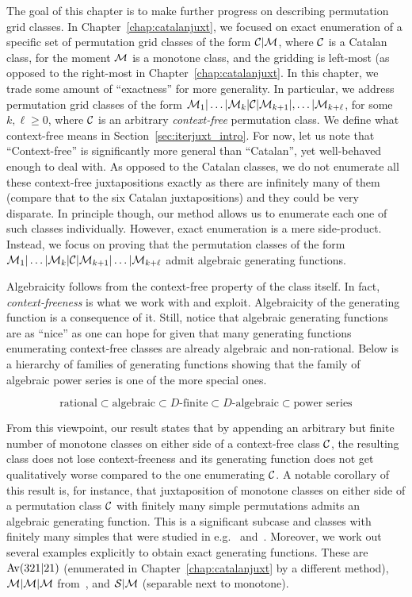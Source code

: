 \documentclass[12pt, a4paper, twoside]{report}
\begin{document}
The goal of this chapter is to make further progress on describing permutation grid classes. In Chapter~\ref{chap:catalanjuxt}, we focused on exact enumeration of a specific set of permutation grid classes of the form $\mathcal{C}|\mathcal{M}$, where $\mathcal{C}$ is a Catalan class, for the moment $\mathcal{M}$ is a monotone class, and the gridding is left-most (as opposed to the right-most in Chapter~\ref{chap:catalanjuxt}. In this chapter, we trade some amount of ``exactness'' for more generality. In particular, we address permutation grid classes of the form $\mathcal{M}_1|\ldots|\mathcal{M}_k|\mathcal{C}|\mathcal{M}_{k+1}|,\ldots|\mathcal{M}_{k+\ell}$, for some $k,\ell \geq 0$, where $\mathcal{C}$ is an arbitrary \emph{context-free} permutation class. We define what context-free means in Section~\ref{sec:iterjuxt_intro}. For now, let us note that ``Context-free'' is significantly more general than ``Catalan'', yet well-behaved enough to deal with. As opposed to the Catalan classes, we do not enumerate all these context-free juxtapositions exactly as there are infinitely many of them (compare that to the six Catalan juxtapositions) and they could be very disparate. In principle though, our method allows us to enumerate each one of such classes individually. However, exact enumeration is a mere side-product. Instead, we focus on proving that the permutation classes of the form $\mathcal{M}_1|\ldots|\mathcal{M}_k|\mathcal{C}|\mathcal{M}_{k+1}|\ldots|\mathcal{M}_{k+\ell}$ admit algebraic generating functions.

Algebraicity follows from the context-free property of the class itself. In fact, \emph{context-freeness} is what we work with and exploit. Algebraicity of the generating function is a consequence of it. Still, notice that algebraic generating functions are as ``nice'' as one can hope for given that many generating functions enumerating context-free classes are already algebraic and non-rational. Below is a hierarchy of families of generating functions showing that the family of algebraic power series is one of the more special ones.

$$\text{rational} \subset \text{algebraic} \subset \text{$D$-finite} \subset \text{$D$-algebraic} \subset \text{power series}$$

From this viewpoint, our result states that by appending an arbitrary but finite number of monotone classes on either side of a context-free class $\mathcal{C}$, the resulting class does not lose context-freeness and its generating function does not get qualitatively worse compared to the one enumerating $\mathcal{C}$. A notable corollary of this result is, for instance, that juxtaposition of monotone classes on either side of a permutation class $\mathcal{C}$ with finitely many simple permutations admits an algebraic generating function. This is a significant subcase and classes with finitely many simples that were studied in e.g.~\cite{albertatkinsonrestricted} and~\cite{brignall2008simple}. Moreover, we work out several examples explicitly to obtain exact generating functions. These are $\mathrm{Av}(321|21)$ (enumerated in Chapter~\ref{chap:catalanjuxt} by a different method), $\mathcal{M}|\mathcal{M}|\mathcal{M}$ from~\cite{bevan2015thesis}, and $\mathcal{S}|\mathcal{M}$ (separable next to monotone).
\end{document}
